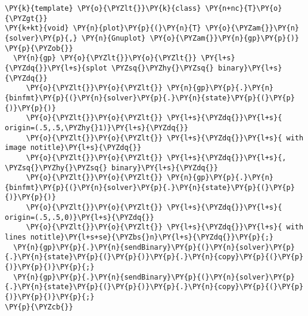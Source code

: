 \begin{Verbatim}[commandchars=\\\{\}]
\PY{k}{template} \PY{o}{\PYZlt{}}\PY{k}{class} \PY{n+nc}{T}\PY{o}{\PYZgt{}}
\PY{k+kt}{void} \PY{n}{plot}\PY{p}{(}\PY{n}{T} \PY{o}{\PYZam{}}\PY{n}{solver}\PY{p}{,} \PY{n}{Gnuplot} \PY{o}{\PYZam{}}\PY{n}{gp}\PY{p}{)}
\PY{p}{\PYZob{}}
  \PY{n}{gp} \PY{o}{\PYZlt{}}\PY{o}{\PYZlt{}} \PY{l+s}{\PYZdq{}}\PY{l+s}{splot \PYZsq{}\PYZhy{}\PYZsq{} binary}\PY{l+s}{\PYZdq{}} 
     \PY{o}{\PYZlt{}}\PY{o}{\PYZlt{}} \PY{n}{gp}\PY{p}{.}\PY{n}{binfmt}\PY{p}{(}\PY{n}{solver}\PY{p}{.}\PY{n}{state}\PY{p}{(}\PY{p}{)}\PY{p}{)}
     \PY{o}{\PYZlt{}}\PY{o}{\PYZlt{}} \PY{l+s}{\PYZdq{}}\PY{l+s}{ origin=(.5,.5,\PYZhy{}1)}\PY{l+s}{\PYZdq{}}
     \PY{o}{\PYZlt{}}\PY{o}{\PYZlt{}} \PY{l+s}{\PYZdq{}}\PY{l+s}{ with image notitle}\PY{l+s}{\PYZdq{}}
     \PY{o}{\PYZlt{}}\PY{o}{\PYZlt{}} \PY{l+s}{\PYZdq{}}\PY{l+s}{, \PYZsq{}\PYZhy{}\PYZsq{} binary}\PY{l+s}{\PYZdq{}} 
     \PY{o}{\PYZlt{}}\PY{o}{\PYZlt{}} \PY{n}{gp}\PY{p}{.}\PY{n}{binfmt}\PY{p}{(}\PY{n}{solver}\PY{p}{.}\PY{n}{state}\PY{p}{(}\PY{p}{)}\PY{p}{)}
     \PY{o}{\PYZlt{}}\PY{o}{\PYZlt{}} \PY{l+s}{\PYZdq{}}\PY{l+s}{ origin=(.5,.5,0)}\PY{l+s}{\PYZdq{}}
     \PY{o}{\PYZlt{}}\PY{o}{\PYZlt{}} \PY{l+s}{\PYZdq{}}\PY{l+s}{ with lines notitle}\PY{l+s+se}{\PYZbs{}n}\PY{l+s}{\PYZdq{}}\PY{p}{;}
  \PY{n}{gp}\PY{p}{.}\PY{n}{sendBinary}\PY{p}{(}\PY{n}{solver}\PY{p}{.}\PY{n}{state}\PY{p}{(}\PY{p}{)}\PY{p}{.}\PY{n}{copy}\PY{p}{(}\PY{p}{)}\PY{p}{)}\PY{p}{;}
  \PY{n}{gp}\PY{p}{.}\PY{n}{sendBinary}\PY{p}{(}\PY{n}{solver}\PY{p}{.}\PY{n}{state}\PY{p}{(}\PY{p}{)}\PY{p}{.}\PY{n}{copy}\PY{p}{(}\PY{p}{)}\PY{p}{)}\PY{p}{;}
\PY{p}{\PYZcb{}}


\end{Verbatim}
